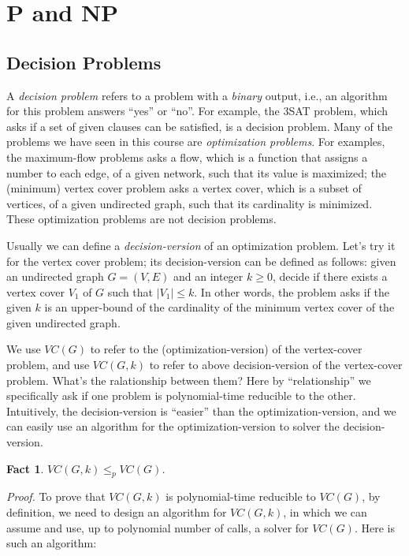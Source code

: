 \documentclass[letterpaper,11pt]{article}
\theoremstyle{mytheorem}
\newtheorem{fact}{Fact}
\begin{document}
\section*{P and NP}

\subsection*{Decision Problems}

A \emph{decision problem} refers to a problem with a \emph{binary} output, i.e., an algorithm
for this problem answers ``yes'' or ``no''.
For example, the 3SAT problem, which asks if a set of given clauses can be satisfied, is a decision problem.
Many of the problems we have seen in this course are \emph{optimization problems}. For examples, the maximum-flow problems
asks a flow, which is a function that assigns a number to each edge, of a given network, such that its value is maximized;
the (minimum) vertex cover problem asks a vertex cover, which is a subset of vertices, of a given undirected graph, 
such that its cardinality is minimized. These optimization problems are not decision problems.

Usually we can define a \emph{decision-version} of an optimization problem. Let's try it for the vertex cover problem;
its decision-version can be defined as follows: given an undirected graph $G = (V, E)$ and an integer $k\ge 0$,
decide if there exists a vertex cover $V_1$ of $G$ such that $|V_1| \le k$. In other words, the problem asks if the
given $k$ is an upper-bound of the cardinality of the minimum vertex cover of the given undirected graph.

We use $VC(G)$ to refer to the (optimization-version) of the vertex-cover problem, and use $VC(G, k)$ to refer to
above decision-version of the vertex-cover problem. What's the ralationship between them? Here by ``relationship''
we specifically ask if one problem is polynomial-time reducible to the other. Intuitively, the decision-version
is ``easier'' than the optimization-version, and we can easily use an algorithm for the optimization-version
to solver the decision-version.
\begin{fact}
$VC(G, k)\le_p VC(G)$.
\end{fact}
\emph{Proof.} To prove that $VC(G,k)$ is polynomial-time reducible to $VC(G)$, by definition, 
we need to design an algorithm for $VC(G, k)$, in which we can assume and use, up to polynomial number of calls,
a solver for $VC(G)$. Here is such an algorithm:
\end{document}
